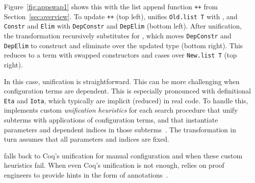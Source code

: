 Figure~\ref{fig:appswap1} shows this with the list append function \lstinline{++} from Section~\ref{sec:overview}.
To update \lstinline{++} (top left), \toolname unifies \lstinline{Old.list T} with \A, and \lstinline{Constr} and \lstinline{Elim}
with \lstinline{DepConstr} and \lstinline{DepElim} (bottom left).
After unification, the transformation recursively substitutes \B
for \A, which moves \lstinline{DepConstr} and \lstinline{DepElim}
to construct and eliminate over the updated type (bottom right).
This reduces to a term with swapped constructors and cases over \lstinline{New.list T} (top right).

In this case, unification is straightforward. %
This can be more challenging when configuration terms are dependent.
This is especially pronounced with definitional \lstinline{Eta} and \lstinline{Iota},
which typically are implicit (reduced) in real code.
To handle this, \toolname implements custom \textit{unification heuristics} for each search procedure
that unify subterms with applications of configuration terms, and that instantiate parameters and dependent indices in those subterms~\href{https://github.com/uwplse/pumpkin-pi/blob/silent/plugin/src/automation/lift/liftconfig.ml}{}. %
The transformation in turn assumes that all parameters and indices are fixed.

\toolname falls back to Coq's unification for manual configuration and when these custom heuristics fail.
When even Coq's unification is not enough, \toolname relies on proof engineers to provide hints
in the form of annotations~\href{https://github.com/uwplse/pumpkin-pi/blob/silent/plugin/coq/nonorn.v}{}.

